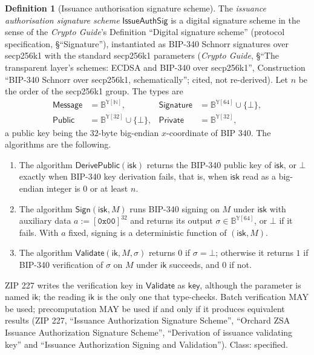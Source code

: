 \documentclass[11pt,a4paper]{article}
\theoremstyle{definition}
\newtheorem{definition}[theorem]{Definition}
\begin{document}
\begin{definition}[Issuance authorisation signature scheme]
\label{def:issueauthsig}
The \emph{issuance authorisation signature scheme} $\mathsf{IssueAuthSig}$
is a digital signature scheme in the sense of the \emph{Crypto Guide}'s
Definition ``Digital signature scheme'' (protocol specification,
\S``Signature''), instantiated as BIP-340 Schnorr signatures over secp256k1
with the standard secp256k1 parameters (\emph{Crypto Guide}, \S``The
transparent layer's schemes: ECDSA and BIP-340 over secp256k1'',
Construction ``BIP-340 Schnorr over secp256k1, schematically''; cited, not
re-derived). Let $n$ be the order of the secp256k1 group. The types are
\begin{align*}
  \mathsf{Message} &= \mathbb{B}^{\mathbb{Y}[\mathbb{N}]}, &
  \mathsf{Signature} &= \mathbb{B}^{\mathbb{Y}[64]} \cup \{\bot\}, \\
  \mathsf{Public} &= \mathbb{B}^{\mathbb{Y}[32]} \cup \{\bot\}, &
  \mathsf{Private} &= \mathbb{B}^{\mathbb{Y}[32]},
\end{align*}
a public key being the $32$-byte big-endian $x$-coordinate of BIP 340. The
algorithms are the following.
\begin{enumerate}
\item The algorithm $\mathsf{DerivePublic}(\mathsf{isk})$ returns the BIP-340
  public key of $\mathsf{isk}$, or $\bot$ exactly when BIP-340 key
  derivation fails, that is, when $\mathsf{isk}$ read as a big-endian integer
  is $0$ or at least $n$.
\item The algorithm $\mathsf{Sign}(\mathsf{isk}, M)$ runs BIP-340 signing on
  $M$ under $\mathsf{isk}$ with auxiliary data $a := [\mathtt{0x00}]^{32}$
  and returns its output $\sigma \in \mathbb{B}^{\mathbb{Y}[64]}$, or $\bot$
  if it fails. With $a$ fixed, signing is a deterministic function of
  $(\mathsf{isk}, M)$.
\item The algorithm $\mathsf{Validate}(\mathsf{ik}, M, \sigma)$ returns $0$
  if $\sigma = \bot$; otherwise it returns $1$ if BIP-340 verification of
  $\sigma$ on $M$ under $\mathsf{ik}$ succeeds, and $0$ if not.
\end{enumerate}
ZIP 227 writes the verification key in $\mathsf{Validate}$ as
$\mathsf{key}$, although the parameter is named $\mathsf{ik}$; the reading
$\mathsf{ik}$ is the only one that type-checks. Batch verification MAY be
used; precomputation MAY be used if and only if it produces equivalent
results (ZIP 227, ``Issuance Authorization Signature Scheme'', ``Orchard ZSA
Issuance Authorization Signature Scheme'', ``Derivation of issuance
validating key'' and ``Issuance Authorization Signing and Validation'').
Class: specified.
\end{definition}
\end{document}
